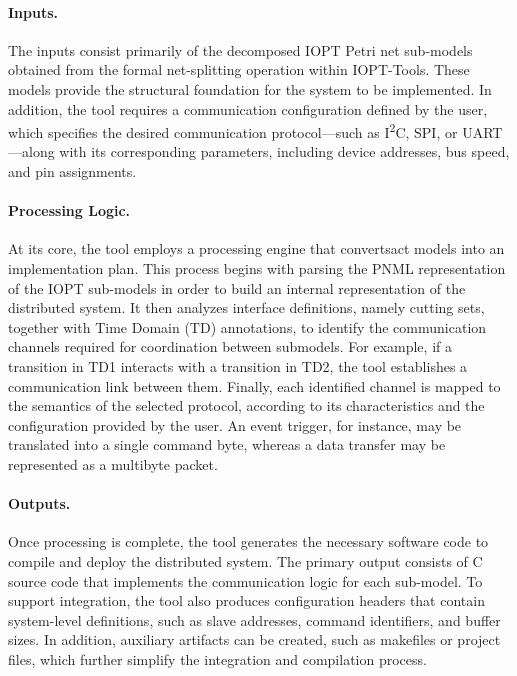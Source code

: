 \paragraph{Inputs.}
The inputs consist primarily of the decomposed IOPT Petri net sub-models obtained from the formal net-splitting operation within IOPT-Tools. These models provide the structural foundation for the system to be implemented. In addition, the tool requires a communication configuration defined by the user, which specifies the desired communication protocol—such as I\textsuperscript{2}C, SPI, or UART—along with its corresponding parameters, including device addresses, bus speed, and pin assignments.

\paragraph{Processing Logic.}
At its core, the tool employs a processing engine that convertsact models into an implementation plan. This process begins with parsing the PNML representation of the IOPT sub-models in order to build an internal representation of the distributed system. It then analyzes interface definitions, namely cutting sets, together with Time Domain (TD) annotations, to identify the communication channels required for coordination between submodels. For example, if a transition in TD1 interacts with a transition in TD2, the tool establishes a communication link between them. Finally, each identified channel is mapped to the semantics of the selected protocol, according to its characteristics and the configuration provided by the user. An event trigger, for instance, may be translated into a single command byte, whereas a data transfer may be represented as a multibyte packet.

\paragraph{Outputs.}
Once processing is complete, the tool generates the necessary software code to compile and deploy the distributed system. The primary output consists of C source code that implements the communication logic for each sub-model. To support integration, the tool also produces configuration headers that contain system-level definitions, such as slave addresses, command identifiers, and buffer sizes. In addition, auxiliary artifacts can be created, such as makefiles or project files, which further simplify the integration and compilation process.


